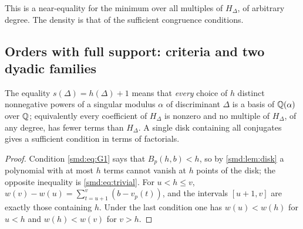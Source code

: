 This is a near-equality for the minimum over all multiples of $H_\Delta$, of arbitrary
degree. The density is that of the sufficient congruence conditions.

\subsection{Orders with full support: criteria and two dyadic families}\label{smd:sec:full}
{\raggedright{}}

The equality $s(\Delta)=h(\Delta)+1$ means that \emph{every} choice of $h$ distinct
nonnegative powers of a singular modulus $\alpha$ of discriminant $\Delta$ is a basis of
$\mathbb{Q}(\alpha)$ over $\mathbb{Q}$; equivalently every coefficient of $H_\Delta$ is nonzero and no
multiple of $H_\Delta$, of any degree, has fewer terms than $H_\Delta$. A single disk
containing all conjugates gives a sufficient condition in terms of factorials.


\begin{proof}
Condition \eqref{smd:eq:G1} says that $B_p(h,b)<h$, so by \cref{smd:lem:disk} a polynomial
with at most $h$ terms cannot vanish at $h$ points of the disk; the opposite inequality is
\eqref{smd:eq:trivial}. For $u<h\le v$,
$w(v)-w(u)=\sum_{t=u+1}^{v}(b-v_p(t))$, and the intervals $[u+1,v]$ are exactly those
containing $h$. Under the last condition one has $w(u)<w(h)$ for $u<h$ and
$w(h)<w(v)$ for $v>h$.
\end{proof}

